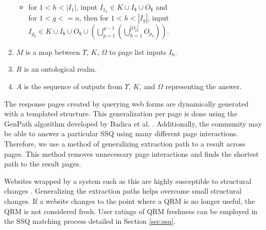\begin{enumerate}
\begin{itemize}
\item for $1 < h < \left| I_1 \right|$, input $I_{1_h} \in K \cup
  I_{\$} \cup O_{\$}$ and \\ for $1 < g <= n$, then for $1 < h <
  \left| I_g \right|$, input $I_{g_h} \in K \cup I_{\$} \cup O_{\$}
  \cup \left( \bigcup^{g-1}_{p=1} \left(
  \bigcup^{\left|O_p\right|}_{h=1}O_{p_h} \right)\right)$.
\end{itemize}

\item $M$ is a map between $\Upsilon$, $K$, $\Omega$ to page list inputs $I_h$.

\item $R$ is an ontological realm. 

\item $A$ is the sequence of outputs from $\Upsilon$, $K$, and
  $\Omega$ representing the answer.

\end{enumerate}


The response pages created by querying web forms are dynamically
generated with a templated structure. This generalization per page is
done using the GenPath algorithm developed by Badica et
al. \cite{Badica06}. Additionally, the community may be able to answer
a particular SSQ using many different page interactions. Therefore, we
use a method of generalizing extraction path to a result across
pages. This method removes unnecessary page interactions and finds the
shortest path to the result pages.

Websites wrapped by a system such as this are highly susceptible to
structural changes \cite{TanZMG07}. Generalizing the extraction paths
helps overcome small structural changes. If a website changes to the
point where a QRM is no longer useful, the QRM is not considered
fresh. User ratings of QRM freshness can be employed in the SSQ matching
process detailed in Section \ref{sec:ssq}.

